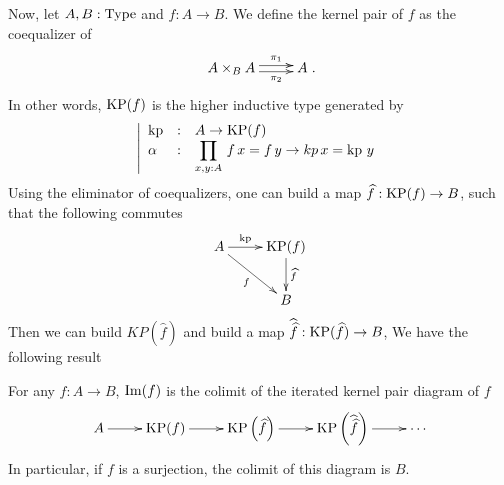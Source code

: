 Now, let $A,B:\operatorname{Type}$ and $f:A\to B$. We define the kernel pair of $f$
as the coequalizer of \[ \xymatrix{ A\times_B A \ar@<-.5ex>[r]_-{\pi_2}
      \ar@<.5ex>[r]^-{\pi_1} & A }.\]
In other words, $\operatorname{KP}(f)$ is the higher inductive type generated by
\[\left|
    \begin{array}{lll}
      \operatorname{kp} &:& A\to \operatorname{KP}(f) \\
      \alpha &:& \displaystyle{\prod_{x,y:A}\, f\, x = f\, y \to kp\,x=\operatorname{kp}\,y}
    \end{array}
  \right.\]
Using the eliminator of coequalizers, one can build a map $\widehat
f:\operatorname{KP}(f) \to B$, such that the following commutes
\[\xymatrix{
    A \ar[r]^-{\kp} \ar[rd]_-f & \KP(f) \ar[d]^-{\widehat f} \\
    &B
}\]
Then we can build $KP(\widehat f)$ and build a map $\widehat{\widehat
  f}:\operatorname{KP}(\widehat f) \to B$, \etc{}
We have the following result
\begin{prop}\label{prop:cech'}
  For any $f:A\to B$, $\operatorname{Im}(f)$ is the colimit of the iterated kernel
  pair diagram of $f$
\[\xymatrix{
  A \ar[r] & \KP(f) \ar[r] & \KP\left(\widehat f\right) \ar[r]& \KP\left(\widehat{\widehat f}\right) \ar[r]& \cdots
}\]
In particular, if $f$ is a surjection, the colimit of this diagram is $B$.
\end{prop}
